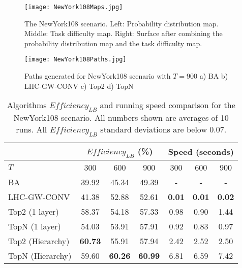 \documentclass[journal]{IEEEtran}
\begin{document}
\begin{figure}[!ht]
\centering
\texttt{[image: NewYork108Maps.jpg]}
\caption{The NewYork108 scenario. Left: Probability distribution map. Middle: Task difficulty map. Right: Surface after combining the probability distribution map and the task difficulty map.}
\label{NewYork108Maps}
\end{figure}
\begin{figure}[!ht]
\centering
\texttt{[image: NewYork108Paths.jpg]}
\caption{Paths generated for NewYork108 scenario with $T=900$ a) BA b) LHC-GW-CONV c) Top2 d) TopN}
\label{NewYork108Paths}
\end{figure}
\begin{table}[!ht]
\caption{Algorithms $\mathit{Efficiency_{LB}}$ and running speed comparison for the NewYork108 scenario. All numbers shown are averages of 10 runs. All $\mathit{Efficiency_{LB}}$ standard deviations are below 0.07.}
	\centering
		\begin{tabular}
			{|l|c|c|c|c|c|c|}
			\hline
			 & \multicolumn{3}{|c|}{$\mathit{Efficiency_{LB}}$ (\%)} & \multicolumn{3}{|c|}{Speed (seconds)} \\
			\hline
			$T$ & 300 & 600 & 900	& 300 & 600 & 900 \\
			\hline
			BA & 39.92 & 45.34 & 49.39 & - & - & - \\
			\hline			
			LHC-GW-CONV & 41.38 & 52.88 & 52.61 & \textbf{0.01} & \textbf{0.01} & \textbf{0.02} \\
			\hline			
			Top2 (1 layer)	& 58.37 & 54.18 & 57.33 & 0.98 & 0.90 & 1.44 \\ 
			\hline
			TopN (1 layer)	& 54.03 & 53.91 & 57.91 & 0.92 & 0.83 & 0.97 \\ 
			\hline
			Top2 (Hierarchy) & \textbf{60.73} & 55.91 & 57.94 & 2.42 & 2.52 & 2.50 \\ 
			\hline
			TopN (Hierarchy) & 59.60 & \textbf{60.26} & \textbf{60.99} & 6.81 & 6.59 & 7.42 \\ 
			\hline			
		\end{tabular}
\label{NewYork108}
\end{table}
\end{document}
